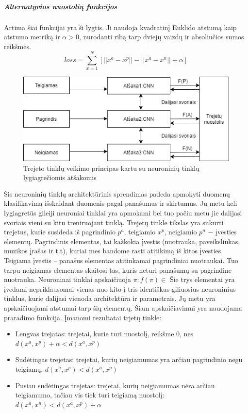 \documentclass{VUMIFPSkursinis}
\begin{document}
\subparagraph{Alternatyvios nuostolių funkcijos}
Artima šiai funkcijai yra ši lygtis. Ji naudoja kvadratinį Euklido \cite{Aerial_image_similarity} atstumą kaip atstumo metriką ir $\alpha > 0$, nurodanti ribą tarp dviejų vaizdų ir absoliučios sumos reikšmės.
\[loss = \sum_{x=1}^{N} [||x^a - x^p|| - ||x^a - x^n|| + \alpha]\]

\begin{figure}[H]
\centering
\includegraphics[scale=0.8]{img/Triplet_network_branchCNN}
\caption{Trejeto tinklų veikimo principas kartu su neuroninių tinklų lygiagrečiomis atšakomis} %
\label{img:mlp}
\end{figure}

Šis neuroninių tinklų architektūrinis sprendimas padeda apmokyti duomenų klasifikavimą išskaidant duomenis pagal panašumus ir skirtumus. Jų metu keli lygiagretūs gileiji neuroniai tinklai yra apmokami bei tuo pačiu metu jie dalijasi svoriais vieni su kitu treniruojant tinklą. Trejetų tinkle tikslas yra sukurti trejetus, kurie susideda iš pagrindinio $p^a$, teigiamio $x^p$, neigiamio $p^n$ − įvesties elementų. Pagrindinis elementas, tai kažkokia įvestis (nuotrauka, paveiksliukas, muzikos įrašas ir t.t), kuriai mes bandome rasti atitikimą iš kitos įvesties. Teigiama įvestis – panašus elementas atitinkamai pagrindiniai nuotraukai. Tuo tarpu neigiamas elementas skaitosi tas, kuris neturi panašumų su pagrindine nuotrauka. Neuroninai tinklai apskaičiuoja  $\pi : f(\pi) \in$
Šie trys elementai yra įvedami nepriklausomai vienas nuo kito į  tris identiškus giliuosius neuroninius tinklus, kurie dalijasi vienoda architektūra ir parametrais. Jų metu yra apskaičiuojami atstumai tarp šių elementų. Šiam apskaičiavimui yra naudojama praradimo funkcija.
\newline
Įmanomi rezultatai trjetų tinkle:
\begin{itemize}
\item{Lengvas trejatas: trejetai, kurie turi nuostolį, reikšme 0, nes $d(x^a, x^p) + \alpha < d(x^a, x^p)$}
\item{Sudėtingas trejetas: trejetai, kurių neigiamumas yra arčiau pagrindinio negu teigiamų, $d(x^a, x^p) < d(x^a, x^p)$}
\item{Pusiau sudėtingas trejetas: trejetai, kurių neigiamumas nėra arčiau teigiamumo, tačiau vis tiek turi teigiamą nuostolį: $d(x^a, x^n) < d(x^a, x^p) +\alpha$}
\end{itemize}
\end{document}
